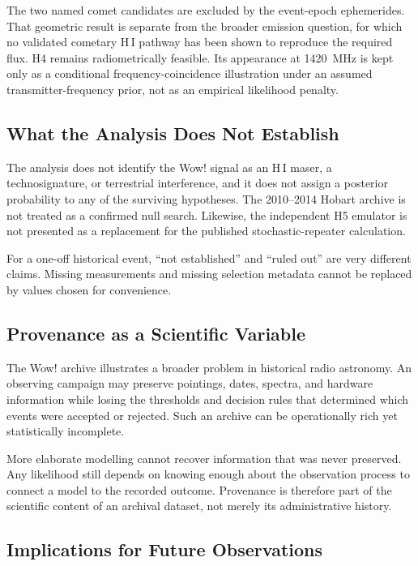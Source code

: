 \documentclass[crop]{CSL}
\begin{document}
The two named comet candidates are excluded by the event-epoch ephemerides. That geometric result is separate from the broader emission question, for which no validated cometary H\,I pathway has been shown to reproduce the required flux. H4 remains radiometrically feasible. Its appearance at 1420~MHz is kept only as a conditional frequency-coincidence illustration under an assumed transmitter-frequency prior, not as an empirical likelihood penalty.

\subsection{What the Analysis Does Not Establish}

The analysis does not identify the Wow! signal as an H\,I maser, a technosignature, or terrestrial interference, and it does not assign a posterior probability to any of the surviving hypotheses. The 2010--2014 Hobart archive is not treated as a confirmed null search. Likewise, the independent H5 emulator is not presented as a replacement for the published stochastic-repeater calculation.

For a one-off historical event, ``not established'' and ``ruled out'' are very different claims. Missing measurements and missing selection metadata cannot be replaced by values chosen for convenience.

\subsection{Provenance as a Scientific Variable}

The Wow! archive illustrates a broader problem in historical radio astronomy. An observing campaign may preserve pointings, dates, spectra, and hardware information while losing the thresholds and decision rules that determined which events were accepted or rejected. Such an archive can be operationally rich yet statistically incomplete.

More elaborate modelling cannot recover information that was never preserved. Any likelihood still depends on knowing enough about the observation process to connect a model to the recorded outcome. Provenance is therefore part of the scientific content of an archival dataset, not merely its administrative history.

\subsection{Implications for Future Observations}
\end{document}
